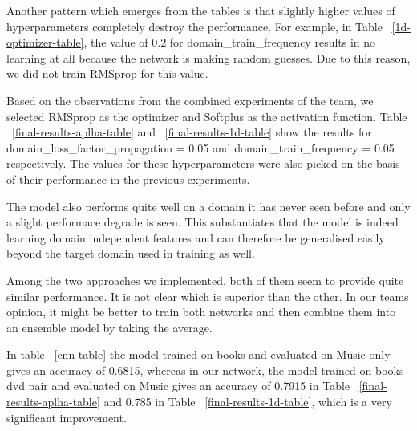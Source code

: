 \documentclass[11pt,a4paper]{article}
\begin{document}
Another pattern which emerges from the tables is that slightly higher values of hyperparameters completely destroy the performance. For example, in Table ~\ref{1d-optimizer-table}, the value of 0.2 for domain\_train\_frequency results in no learning at all because the network is making random guesses. Due to this reason, we did not train RMSprop for this value.

Based on the observations from the combined experiments of the team, we selected RMSprop as the optimizer and Softplus as the activation function. Table ~\ref{final-results-aplha-table} and ~\ref{final-results-1d-table} show the results for domain\_loss\_factor\_propagation = 0.05 and domain\_train\_frequency = 0.05 respectively. The values for these hyperparameters were also picked on the basis of their performance in the previous experiments.

The model also performs quite well on a domain it has never seen before and only a slight performace degrade is seen. This substantiates that the model is indeed learning domain independent features and can therefore be generalised easily beyond the target domain used in training as well.

Among the two approaches we implemented, both of them seem to provide quite similar performance. It is not clear which is superior than the other. In our teams opinion, it might be better to train both networks and then combine them into an ensemble model by taking the average.

In table ~\ref{cnn-table} the model trained on books and evaluated on Music only gives an accuracy of 0.6815, whereas in our network, the model trained on books-dvd pair and evaluated on Music gives an accuracy of 0.7915 in Table ~\ref{final-results-aplha-table} and 0.785 in Table ~\ref{final-results-1d-table}, which is a very significant improvement.
\end{document}
